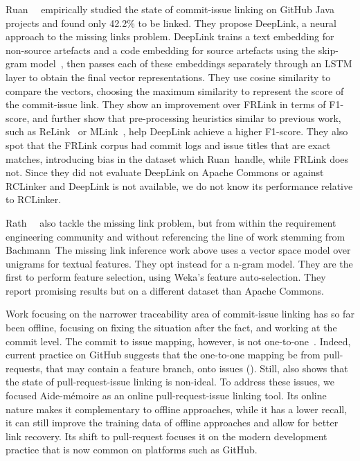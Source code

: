 Ruan~\etal~\cite{ruan2019deeplink} empirically studied the state of commit-issue
linking on GitHub Java projects and found only 42.2\% to be linked. They propose
DeepLink, a neural approach to the missing links problem. DeepLink trains a text
embedding for non-source artefacts and a code embedding for source artefacts
using the skip-gram model~\cite{mikolov2013efficient, mikolov2013distributed},
then passes each of these embeddings separately through an LSTM layer to obtain
the final vector representations. They use cosine similarity to compare the
vectors, choosing the maximum similarity to represent the score of the
commit-issue link. They show an improvement over FRLink in terms of F1-score,
and further show that pre-processing heuristics similar to previous work, such
as ReLink~\cite{relink} or MLink~\cite{MLink}, help DeepLink achieve a higher
F1-score. They also spot that the FRLink corpus had commit logs and issue titles
that are exact matches, introducing bias in the dataset which Ruan~\etal handle,
while FRLink does not. Since they did not evaluate DeepLink on Apache Commons or
against RCLinker and DeepLink is not available, we do not know its performance
relative to RCLinker.

Rath~\etal~\cite{1804.02433} also tackle the missing link problem, but from
within the requirement engineering community and without referencing the line of
work stemming from Bachmann~\etal The missing link inference work above uses a
vector space model over unigrams for textual features. They opt instead for a
n-gram model. They are the first to perform feature selection, using Weka's
feature auto-selection. They report promising results but on a different dataset
than Apache Commons.

Work focusing on the narrower traceability area of commit-issue linking has so
far been offline, focusing on fixing the situation after the fact, and working
at the commit level. The commit to issue mapping, however, is not
one-to-one~\cite{Kawrykow2011}. Indeed, current practice on GitHub suggests that
the one-to-one mapping be from pull-requests, that may contain a feature branch,
onto issues (). Still,  also
shows that the state of pull-request-issue linking is non-ideal. To address
these issues, we focused Aide-mémoire as an online pull-request-issue linking
tool. Its online nature makes it complementary to offline approaches, while it
has a lower recall, it can still improve the training data of offline approaches
and allow for better link recovery. Its shift to pull-request focuses it on the
modern development practice that is now common on platforms such as GitHub.

